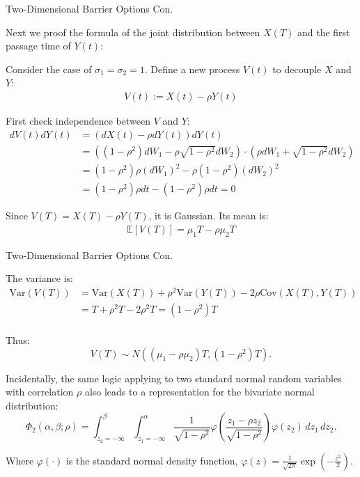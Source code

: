 \documentclass{beamer}
\begin{document}
\begin{frame}{Two-Dimensional Barrier Options Con.}

    {\footnotesize \footnotesize
    Next we proof the formula of the joint distribution between \( X(T) \) 
    and the first passage time of \( Y(t) \):\pause
    \par [Proof]
    \par Consider the case of $\sigma_1 = \sigma_2 = 1$. Define a new process $V(t)$ to decouple $X$ and $Y$:
    \begin{align*}
        V(t) := X(t) - \rho Y(t)
    \end{align*}\pause
    \par First check independence between $V$ and $Y$:
    \begin{align*}
        dV(t)  dY(t)  & = (dX(t) - \rho  dY(t))  dY(t)\\
        &= \left( (1 - \rho^2) dW_1 - \rho \sqrt{1 - \rho^2}  
        dW_2 \right) \cdot \left( \rho dW_1 + \sqrt{1 - \rho^2}  dW_2 \right)\\
        &=(1 - \rho^2) \rho (dW_1)^2 - \rho (1 - \rho^2) (dW_2)^2\\
        &= (1 - \rho^2) \rho dt - (1 - \rho^2) \rho dt = 0
    \end{align*}
    \par  Since \( V(T) = X(T) - \rho Y(T) \), it is Gaussian. Its mean is:
    \begin{align*}
        \mathbb{E}[V(T)] = \mu_1 T - \rho \mu_2 T
    \end{align*}
    }
\end{frame}
\begin{frame}{Two-Dimensional Barrier Options Con.}

    {\footnotesize \footnotesize
    \par The variance is:
    \begin{align*}
        \text{Var}(V(T)) 
        &= \text{Var}(X(T)) + \rho^2 \text{Var}(Y(T)) - 2\rho \text{Cov}(X(T), Y(T))\\
        &= T + \rho^2 T - 2\rho^2 T = (1 - \rho^2)T\\
    \end{align*}
    \par Thus:
        \[
        V(T) \sim N((\mu_1 - \rho \mu_2)T, (1 - \rho^2)T).
        \]\pause
    \par Incidentally, the same logic applying to two standard normal random variables with correlation \(\rho\) also leads to a representation for the bivariate normal distribution:
    \[
    \Phi_2(\alpha, \beta; \rho) = \int_{z_2=-\infty}^{\beta} \int_{z_1=-\infty}^{\alpha} \frac{1}{\sqrt{1 - \rho^2}} \varphi\left( \frac{z_1 - \rho z_2}{\sqrt{1 - \rho^2}} \right) \varphi(z_2) \, dz_1 \, dz_2.
    \]
    \par Where $\varphi(\cdot)$ is the standard normal density function, $\varphi(z) = \frac{1}{\sqrt{2\pi}}\exp\left(-\frac{z^2}{2}\right).$

    }
    
\end{frame}
\end{document}
